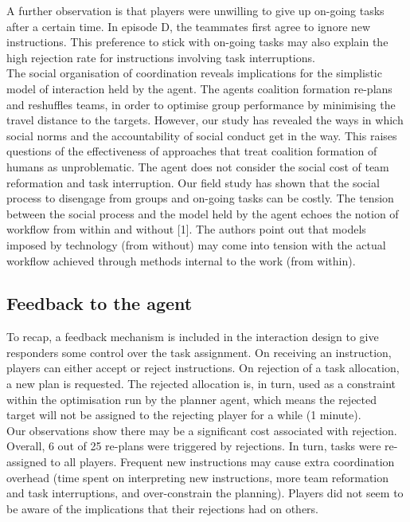 A further observation is that players were unwilling to give up on-going tasks after a certain time. In episode D, the teammates first agree to ignore new instructions. This preference to stick with on-going tasks may also explain the high rejection rate for instructions involving task interruptions. \\

The social organisation of coordination reveals implications for the simplistic model of interaction held by the agent. The agents coalition formation re-plans and reshuffles teams, in order to optimise group performance by minimising the travel distance to the targets. However, our study has revealed the ways in which social norms and the accountability of social conduct get in the way. This raises questions of the effectiveness of approaches that treat coalition formation of humans as unproblematic. The agent does not consider the social cost of team reformation and task interruption. Our field study has shown that the social process to disengage from groups and on-going tasks can be costly. The tension between the social process and the model held by the agent echoes the notion of workflow from within and without [1]. The authors point out that models imposed by technology (from without) may come into tension with the actual workflow achieved through methods internal to the work (from within). 

\subsection{Feedback to the agent}

To recap, a feedback mechanism is included in the interaction design to give responders some control over the task assignment. On receiving an instruction, players can either accept or reject instructions. On rejection of a task allocation, a new plan is requested. The rejected allocation is, in turn, used as a constraint within the optimisation run by the planner agent, which means the rejected target will not be assigned to the rejecting player for a while (1 minute). \\

Our observations show there may be a significant cost associated with rejection. Overall, 6 out of 25 re-plans were triggered by rejections. In turn, tasks were re-assigned to all players. Frequent new instructions may cause extra coordination overhead (time spent on interpreting new instructions, more team reformation and task interruptions, and over-constrain the planning). Players did not seem to be aware of the implications that their rejections had on others.\\
 
